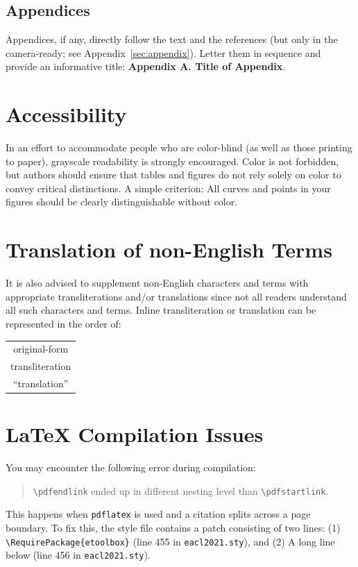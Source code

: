 \documentclass[11pt,a4paper]{article}
\begin{document}
\subsection{Appendices}
Appendices, if any, directly follow the text and the
references (but only in the camera-ready; see Appendix~\ref{sec:appendix}).
Letter them in sequence and provide an informative title:
\textbf{Appendix A. Title of Appendix}.

\section{Accessibility}
\label{ssec:accessibility}

In an effort to accommodate people who are color-blind (as well as those printing to paper), grayscale readability is strongly encouraged.
Color is not forbidden, but authors should ensure that tables and figures do not rely solely on color to convey critical distinctions.
A simple criterion:
All curves and points in your figures should be clearly distinguishable without color.

\section{Translation of non-English Terms}

It is also advised to supplement non-English characters and terms with appropriate transliterations and/or translations since not all readers understand all such characters and terms.
Inline transliteration or translation can be represented in the order of:
\begin{center}
\begin{tabular}{c}
original-form \\
transliteration \\
``translation''
\end{tabular}
\end{center}

\section{\LaTeX{} Compilation Issues}
You may encounter the following error during compilation: 
\begin{quote}
{\small\verb|\pdfendlink|} ended up in different nesting level than {\small\verb|\pdfstartlink|}.
\end{quote}
This happens when \texttt{\small pdflatex} is used and a citation splits across a page boundary.
To fix this, the style file contains a patch consisting of two lines:
(1) {\small\verb|\RequirePackage{etoolbox}|} (line 455 in \texttt{\small eacl2021.sty}), and
(2) A long line below (line 456 in \texttt{\small eacl2021.sty}).
\end{document}
